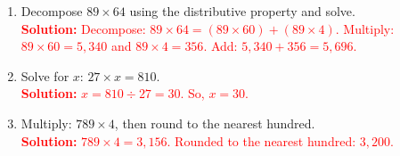 \documentclass[12pt]{article}
\begin{document}
\begin{tcolorbox}[colframe=black!60, colback=white, 
coltitle=black, colbacktitle=black!15, fonttitle=\bfseries\Large, 
title=Exercises, halign title=center, left=10pt, right=10pt, top=10pt, bottom=60pt]
\begin{enumerate}[itemsep=2em]
    \item Decompose \( 89 \times 64 \) using the distributive property and solve.\\
    \textcolor{red}{\textbf{Solution:} Decompose: \(89 \times 64 = (89 \times 60) + (89 \times 4)\). Multiply: \(89 \times 60 = 5,340\) and \(89 \times 4 = 356\). Add: \(5,340 + 356 = 5,696\).}
    
    \item Solve for \( x \): \( 27 \times x = 810 \).\\
    \textcolor{red}{\textbf{Solution:} \(x = 810 \div 27 = 30\). So, \(x = 30\).}
    
    \item Multiply: \( 789 \times 4 \), then round to the nearest hundred.\\
    \textcolor{red}{\textbf{Solution:} \(789 \times 4 = 3,156\). Rounded to the nearest hundred: \(3,200\).}
\end{enumerate}
\end{tcolorbox}

\vspace{1em}
\end{document}
